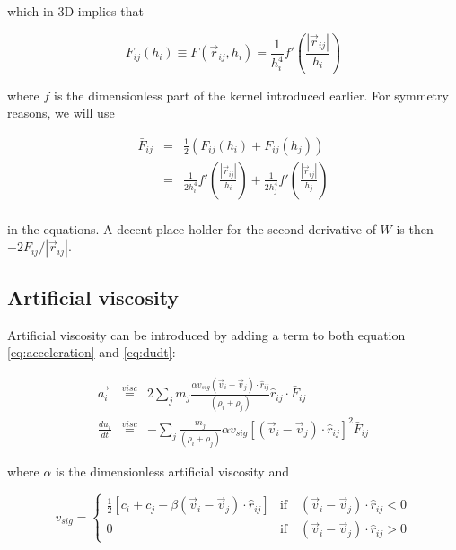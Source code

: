 \documentclass[a4paper,10pt]{article}
\begin{document}
which in 3D implies that

\begin{equation}
 F_{ij}(h_i) \equiv F(\vec{r}_{ij},h_i) = \frac{1}{h_i^4}f'\left(\frac{|\vec{r}_{ij}|}{h_i}\right)
\end{equation}

where $f$ is the dimensionless part of the kernel introduced earlier. For symmetry reasons, we will use

\begin{eqnarray}
 \bar{F}_{ij} &=& \frac{1}{2} \left(F_{ij}(h_i) + F_{ij}(h_j)\right) \\
	      &=& \frac{1}{2h_i^4}f'\left(\frac{|\vec{r}_{ij}|}{h_i}\right) +
\frac{1}{2h_j^4}f'\left(\frac{|\vec{r}_{ij}|}{h_j}\right) \\
\end{eqnarray}

in the equations. A decent place-holder for the second derivative of $W$ is then $-2F_{ij}/|\vec{r}_{ij}|$.

\subsection{Artificial viscosity}

 Artificial viscosity can be introduced by adding a term to both equation \ref{eq:acceleration} and \ref{eq:dudt}:

\begin{eqnarray}
  \vec{a_i} &\stackrel{visc}{=}& 2\sum_j m_j \frac{\alpha v_{sig}\left(\vec{v}_i -
\vec{v}_j\right)\cdot\hat{r}_{ij}}{\left(\rho_i + \rho_j\right)}\hat{r}_{ij}\cdot \bar{F}_{ij} \label{eq:visc}\\
 \frac{du_i}{dt} &\stackrel{visc}{=}& -\sum_j \frac{m_j}{(\rho_i + \rho_j)} \alpha
v_{sig}\left[\left(\vec{v}_i-\vec{v}_j\right)\cdot\hat{r}_{ij}\right]^2 \bar{F}_{ij}
\end{eqnarray}

where $\alpha$ is the dimensionless artificial viscosity and

\begin{equation}
 v_{sig} = \begin{cases}
	    \frac{1}{2}\left[c_i + c_j - \beta\left(\vec{v}_i-\vec{v}_j\right)\cdot\hat{r}_{ij} \right] &
\mbox{if} \quad \left(\vec{v}_i-\vec{v}_j\right)\cdot \hat{r}_{ij} < 0\\
            0 & \mbox{if} \quad \left(\vec{v}_i-\vec{v}_j\right)\cdot \hat{r}_{ij} > 0
            \end{cases}
\end{equation}
\end{document}
